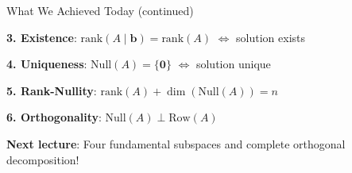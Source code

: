 \documentclass[10pt]{beamer}
\theoremstyle{definition}
\newcommand{\x}[1]{\alert{\textbf{#1}}}
\begin{document}
\begin{frame}{What We Achieved Today (continued)}

\x{3. Existence}: $\text{rank}(A \mid \mathbf{b}) = \text{rank}(A)$ $\iff$ solution exists

\vspace{0.5em}

\x{4. Uniqueness}: $\text{Null}(A) = \{\mathbf{0}\}$ $\iff$ solution unique

\vspace{0.5em}

\x{5. Rank-Nullity}: $\text{rank}(A) + \dim(\text{Null}(A)) = n$

\vspace{0.5em}

\x{6. Orthogonality}: $\text{Null}(A) \perp \text{Row}(A)$

\vspace{1em}

\x{Next lecture}: Four fundamental subspaces and complete orthogonal decomposition!

\end{frame}
\end{document}
